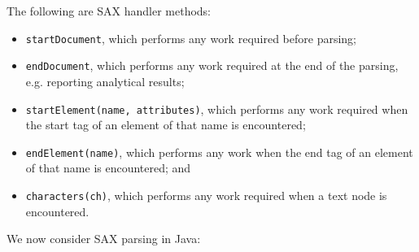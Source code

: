 \documentclass[a4paper, openany]{memoir}
\begin{document}
The following are SAX handler methods:
\begin{itemize}
    \item \texttt{startDocument}, which performs any work required before parsing;
    \item \texttt{endDocument}, which performs any work required at the end of the parsing, e.g. reporting analytical results;
    \item \texttt{startElement(name, attributes)}, which performs any work required when the start tag of an element of that name is encountered;
    \item \texttt{endElement(name)}, which performs any work when the end tag of an element of that name is encountered; and
    \item \texttt{characters(ch)}, which performs any work required when a text node is encountered.
\end{itemize}
We now consider SAX parsing in Java:
\end{document}
